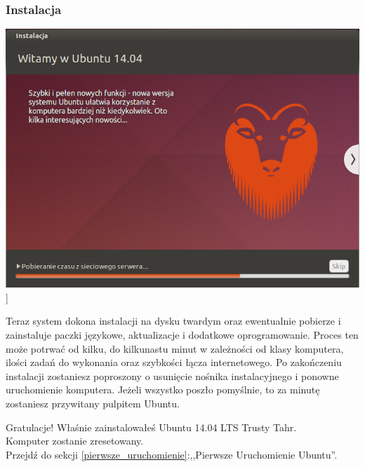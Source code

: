 \subsubsection{Instalacja}
\begin{center}
        \includegraphics[width=\linewidth]{images/instalator_kopiowanie.png}]
\end{center}

Teraz system dokona instalacji na dysku twardym oraz ewentualnie pobierze i zainstaluje paczki językowe, aktualizacje i dodatkowe oprogramowanie. Proces ten może potrwać od kilku, do kilkunastu minut w zależności od klasy komputera, ilości zadań do wykonania oraz szybkości łącza internetowego.
Po zakończeniu instalacji zostaniesz poproszony o usunięcie nośnika instalacyjnego i ponowne uruchomienie komputera. Jeżeli wszystko poszło pomyślnie, to za minutę zostaniesz przywitany pulpitem Ubuntu.
\begin{flushright}
\textcolor{ubuntu_orange}{Gratulacje!} Właśnie zainstalowałeś Ubuntu 14.04 LTS Trusty Tahr.\\
Komputer zostanie zresetowany.\\
Przejdź do sekcji \ref{pierwsze_uruchomienie}:,,Pierwsze Uruchomienie Ubuntu''.
\end{flushright}
\clearpage
